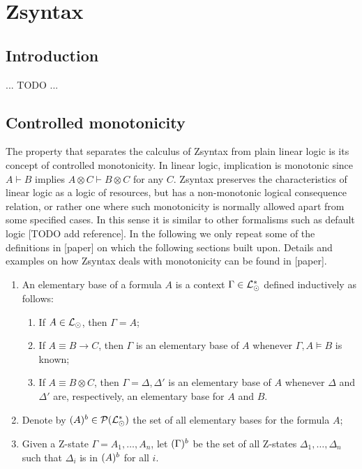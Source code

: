 \section{Zsyntax}

\subsection{Introduction}

... TODO ...

\subsection{Controlled monotonicity}

The property that separates the calculus of Zsyntax from plain linear logic is
its concept of controlled monotonicity. In linear logic, implication is
monotonic since $A \vdash B$ implies $A \otimes C \vdash B \otimes C$ for any
$C$. Zsyntax preserves the characteristics of linear logic as a logic of
resources, but has a non-monotonic logical consequence relation, or rather one
where such monotonicity is normally allowed apart from some specified cases. In
this sense it is similar to other formalisms such as default logic [TODO add
reference]. In the following we only repeat some of the definitions in [paper]
on which the following sections built upon. Details and examples on how Zsyntax
deals with monotonicity can be found in [paper].



\begin{definition}
  \begin{enumerate}
  \item An elementary base of a formula $A$ is a context
    $\Gamma \in \mathcal{L}_{\odot}^*$ defined inductively as follows:

    \begin{enumerate}
    \item If $A \in \mathcal{L}_{\odot}$, then $\Gamma = A$;
    \item If $A \equiv B \rightarrow C$, then $\Gamma$ is an elementary base of
      $A$ whenever $\Gamma, A \models B$ is known;
    \item If $A \equiv B \otimes C$, then $\Gamma = \Delta, \Delta'$ is an
      elementary base of $A$ whenever $\Delta$ and $\Delta'$ are, respectively,
      an elementary base for $A$ and $B$.
    \end{enumerate}

  \item Denote by $(A)^{b} \in \mathcal{P}(\mathcal{L}_{\odot}^*)$ the set of all
    elementary bases for the formula $A$;
  \item Given a Z-state $\Gamma = A_1, \dots, A_n$, let $(\Gamma)^{b}$ be
    the set of all Z-states $\Delta_1, \dots, \Delta_n$ such that $\Delta_i$ is
    in $(A)^{b}$ for all $i$.
  \end{enumerate}
\end{definition}


